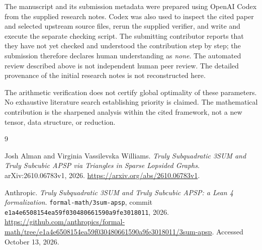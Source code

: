\documentclass[11pt,a4paper]{article}
\theoremstyle{remark}
\begin{document}
The manuscript and its submission metadata were prepared using OpenAI
Codex from the supplied research notes. Codex was also used to inspect
the cited paper and selected upstream source files, rerun the supplied
verifier, and write and execute the separate checking script. The submitting
contributor reports that they have not yet checked and understood the
contribution step by step; the submission therefore declares human
understanding as \emph{none}. The automated review described above is not
independent human peer review. The detailed provenance of the initial
research notes is not reconstructed here.

The arithmetic verification does not certify global optimality of these
parameters. No exhaustive literature search establishing priority is
claimed. The mathematical contribution is the sharpened analysis within
the cited framework, not a new tensor, data structure, or reduction.

\begin{thebibliography}{9}
\raggedright
{}
Josh Alman and Virginia Vassilevska Williams.
\emph{Truly Subquadratic 3SUM and Truly Subcubic APSP via Triangles in Sparse
Lopsided Graphs}.
arXiv:2610.06783v1, 2026.
\url{https://arxiv.org/abs/2610.06783v1}.

Anthropic.
\emph{Truly Subquadratic 3SUM and Truly Subcubic APSP: a Lean 4
formalization}.
\texttt{formal-math/3sum-apsp}, commit
\texttt{e1a4e6508154ea59f030480661590a9fe3018011}, 2026.
\url{https://github.com/anthropics/formal-math/tree/e1a4e6508154ea59f030480661590a9fe3018011/3sum-apsp}.
Accessed October 13, 2026.
\end{thebibliography}
\end{document}
